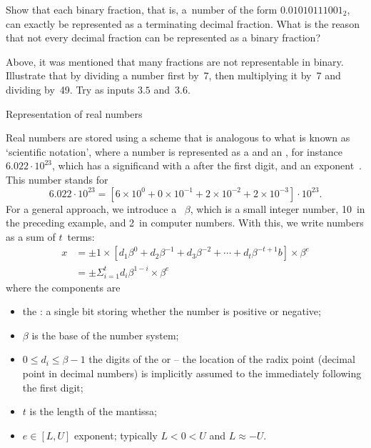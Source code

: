 \begin{exercise}
  Show that each binary fraction, that is,
  a~number of the form $0.01010111001_2$,
  can exactly be represented as a
  terminating decimal fraction. What is the reason that not every
  decimal fraction can be represented as a binary fraction?
\end{exercise}

\begin{exercise}
  \label{ex:fraction-code}
  Above, it was mentioned that many fractions are not
  representable in binary. Illustrate that by dividing a
  number first by~7, then multiplying it by~7 and dividing
  by~49. Try as inputs $3.5$ and~$3.6$.
\end{exercise}

 {Representation of real numbers}
\label{sec:float-representation}

Real numbers are stored using a scheme that is analogous to what is
known as `scientific notation', where a number is represented as a
 and an , for
instance~$6.022\cdot 10^{23}$, which has a significand  with a
 after the first digit, and an exponent~.
This number stands for
\begin{equation}
  6.022\cdot 10^{23}= \left[
    6\times 10^0+0\times 10^{-1}+2\times10^{-2}+2\times10^{-3}
    \right] \cdot 10^{23}. 
\end{equation}
For a general approach,
we introduce a ~$\beta$, which is
a small integer number, 10~in the preceding example, and 2~in computer
numbers.
With this, we write numbers as a sum of $t$~terms:
\begin{equation}
  \begin{array}{rl}
    x &= \pm 1 \times
    \left[ d_1\beta^0+d_2\beta^{-1}+d_3\beta^{-2}+\cdots+d_t\beta^{-t+1}b\right]
    \times \beta^e \\
    & = \pm \Sigma_{i=1}^t d_i\beta^{1-i}  \times\beta^e
  \end{array}
  \label{eq:floatingpoint-def}
\end{equation}
where the components are
\begin{itemize}
\item the : a single bit storing whether the
  number is positive or negative;
\item $\beta$ is the base of the number system;
\item $0\leq d_i\leq \beta-1$ the digits of the 
  or  -- the location of the radix point
  (decimal point in decimal numbers) is implicitly assumed to the
  immediately following the first digit;
\item $t$ is the length of the mantissa;
\item $e\in [L,U]$ exponent; typically $L<{0}<{U} $ and $L\approx-U$.
\end{itemize}

